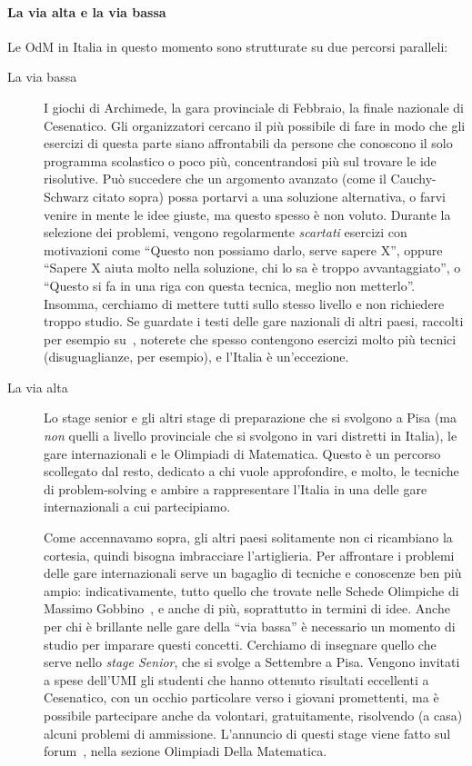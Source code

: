 \documentclass[a4paper,10pt]{paper}
\begin{document}
\paragraph{La via alta e la via bassa}
Le OdM in Italia in questo momento sono strutturate su due percorsi paralleli:
\begin{description}
\item[La via bassa] I giochi di Archimede, la gara provinciale di Febbraio, la finale nazionale di Cesenatico. Gli organizzatori cercano il più possibile di fare in modo che gli esercizi di questa parte siano affrontabili da persone che conoscono il solo programma scolastico o poco più, concentrandosi più sul trovare le ide risolutive. Può succedere che un argomento avanzato (come il Cauchy-Schwarz citato sopra) possa portarvi a una soluzione alternativa, o farvi venire in mente le idee giuste, ma questo spesso è non voluto. Durante la selezione dei problemi, vengono regolarmente \emph{scartati} esercizi con motivazioni come ``Questo non possiamo darlo, serve sapere X'', oppure ``Sapere X aiuta molto nella soluzione, chi lo sa è troppo avvantaggiato'', o ``Questo si fa in una riga con questa tecnica, meglio non metterlo''. Insomma, cerchiamo di mettere tutti sullo stesso livello e non richiedere troppo studio. Se guardate i testi delle gare nazionali di altri paesi, raccolti per esempio su~\cite{mathlinks}, noterete che spesso contengono esercizi molto più tecnici (disuguaglianze, per esempio), e l'Italia è un'eccezione.
 
\item[La via alta] Lo stage senior e gli altri stage di preparazione che si svolgono a Pisa (ma \emph{non} quelli a livello provinciale che si svolgono in vari distretti in Italia), le gare internazionali e le Olimpiadi di Matematica. Questo è un percorso scollegato dal resto, dedicato a chi vuole approfondire, e molto, le tecniche di problem-solving e ambire a rappresentare l'Italia in una delle gare internazionali a cui partecipiamo.

Come accennavamo sopra, gli altri paesi solitamente non ci ricambiano la cortesia, quindi bisogna imbracciare l'artiglieria. Per affrontare i problemi delle gare internazionali serve un bagaglio di tecniche e conoscenze ben più ampio: indicativamente, tutto quello che trovate nelle Schede Olimpiche di Massimo Gobbino~\cite{schedeolimpiche}, e anche di più, soprattutto in termini di idee. Anche per chi è brillante nelle gare della ``via bassa'' è necessario un momento di studio per imparare questi concetti. Cerchiamo di insegnare quello che serve nello \emph{stage Senior}, che si svolge a Settembre a Pisa. Vengono invitati a spese dell'UMI gli studenti che hanno ottenuto risultati eccellenti a Cesenatico, con un occhio particolare verso i giovani promettenti, ma è possibile partecipare anche da volontari, gratuitamente, risolvendo (a casa) alcuni problemi di ammissione. L'annuncio di questi stage viene fatto sul forum~\cite{oliforum}, nella sezione Olimpiadi Della Matematica.
\end{description}
\end{document}
